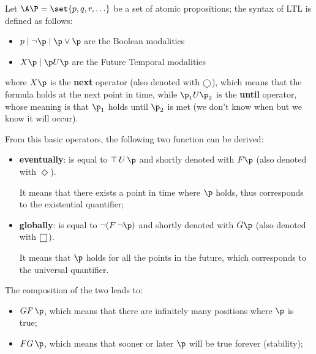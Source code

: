 \documentclass[oneside]{academica}
\begin{document}
\begin{definition*}
  Let $\A\P = \set{p,q,r,\ldots}$ be a set of atomic propositions; the syntax of LTL is defined as follows:
  \begin{itemize}
    \item $p \mid \neg\p \mid \p \lor \p$ are the Boolean modalities
    \item $X\p \mid \p U \p$ are the Future Temporal modalities
  \end{itemize}
  where $X\p$ is the \textbf{next} operator (also denoted with $\mcirc$), which means that the formula holds at the next point in time, while $\p_1 U \p_2$ is the \textbf{until} operator, whose meaning is that $\p_1$ holds until $\p_2$ is met (we don't know when but we know it will occur).
\end{definition*}
From this basic operators, the following two function can be derived:
\begin{itemize}
  \item \textbf{eventually}: is equal to $\top\, U\, \p$ and shortly denoted with $F \p$ (also denoted with $\Diamond$).

    It means that there exists a point in time where $\p$ holds, thus corresponds to the existential quantifier;
  \item \textbf{globally}: is equal to $\neg(F\, \neg\p)$ and shortly denoted with $G \p$ (also denoted with $\msquare$).

    It means that $\p$ holds for all the points in the future, which corresponds to the universal quantifier.
\end{itemize}
The composition of the two leads to:
\begin{itemize}
  \item $GF\, \p$, which means that there are infinitely many positions where $\p$ is true;
  \item $FG\, \p$, which means that sooner or later $\p$ will be true forever (stability);
\end{itemize}
\end{document}
